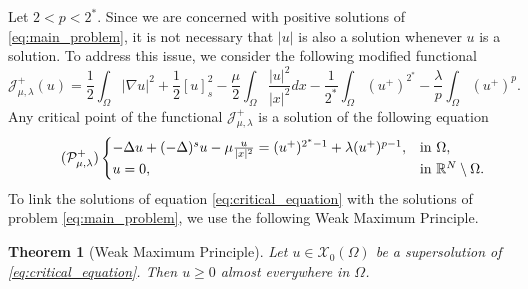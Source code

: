 \documentclass[11pt]{article}
\newtheorem{theorem}{Theorem}[section] %
\newcommand{\om} {\Omega}
\newcommand{\la} {\lambda}
\newcommand{\noi} {\noindent}
\newcommand{\grad}{\nabla}
\newcommand{\X}{\mathcal{X}_0} %
\newcommand{\Jplus}{\mathcal{J}_{\mu,\lambda}^{+}} %
\begin{document}
Let \( 2 < p < 2^* \). Since we are concerned with positive solutions of \eqref{eq:main_problem}, it is not necessary that \(|u|\) is also a solution whenever \( u \) is a solution. To address this issue, we consider the following modified functional
\begin{equation*}
\Jplus(u) = \frac{1}{2} \int_{\om} |\grad u|^2 + \frac{1}{2} [u]_s^2 - \frac{\mu}{2} \int_{\Omega} \frac{|u|^2}{|x|^2} dx 
- \frac{1}{2^*} \int_{\Omega} (u^+)^{2^*} - \frac{\lambda}{p} \int_{\Omega} (u^+)^{p}.
\end{equation*}
\noi Any critical point of the functional \( \Jplus \) is a solution of the following equation
\begin{equation}\tag{$\mathcal{P}_{\mu, \la}^{+}$}
\begin{cases}
-\Delta u + (-\Delta)^s u - \mu \frac{u}{|x|^2} = (u^+)^{2^*-1} + \lambda (u^+)^{p-1}, & \text{in } \Omega, \\
u = 0, & \text{in } \mathbb{R}^N \setminus \Omega.
\end{cases}
\label{eq:critical_equation}
\end{equation}
To link the solutions of equation \eqref{eq:critical_equation} with the solutions of problem \eqref{eq:main_problem}, we use the following Weak Maximum Principle.
\begin{theorem}[Weak Maximum Principle]\label{thm:weak_maximum_principle}
Let \( u \in \X(\Omega) \) be a supersolution of \eqref{eq:critical_equation}. Then \( u \geq 0 \) almost everywhere in \( \Omega \).
\end{theorem}
\end{document}
